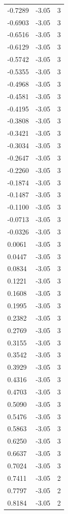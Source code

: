 \begin{longtable}{lrr}
  -0.7289 & -3.05 & 3 \\
  -0.6903 & -3.05 & 3 \\
  -0.6516 & -3.05 & 3 \\
  -0.6129 & -3.05 & 3 \\
  -0.5742 & -3.05 & 3 \\
  -0.5355 & -3.05 & 3 \\
  -0.4968 & -3.05 & 3 \\
  -0.4581 & -3.05 & 3 \\
  -0.4195 & -3.05 & 3 \\
  -0.3808 & -3.05 & 3 \\
  -0.3421 & -3.05 & 3 \\
  -0.3034 & -3.05 & 3 \\
  -0.2647 & -3.05 & 3 \\
  -0.2260 & -3.05 & 3 \\
  -0.1874 & -3.05 & 3 \\
  -0.1487 & -3.05 & 3 \\
  -0.1100 & -3.05 & 3 \\
  -0.0713 & -3.05 & 3 \\
  -0.0326 & -3.05 & 3 \\
  0.0061 & -3.05 & 3 \\
  0.0447 & -3.05 & 3 \\
  0.0834 & -3.05 & 3 \\
  0.1221 & -3.05 & 3 \\
  0.1608 & -3.05 & 3 \\
  0.1995 & -3.05 & 3 \\
  0.2382 & -3.05 & 3 \\
  0.2769 & -3.05 & 3 \\
  0.3155 & -3.05 & 3 \\
  0.3542 & -3.05 & 3 \\
  0.3929 & -3.05 & 3 \\
  0.4316 & -3.05 & 3 \\
  0.4703 & -3.05 & 3 \\
  0.5090 & -3.05 & 3 \\
  0.5476 & -3.05 & 3 \\
  0.5863 & -3.05 & 3 \\
  0.6250 & -3.05 & 3 \\
  0.6637 & -3.05 & 3 \\
  0.7024 & -3.05 & 3 \\
  0.7411 & -3.05 & 2 \\
  0.7797 & -3.05 & 2 \\
  0.8184 & -3.05 & 2 \\

\end{longtable}
